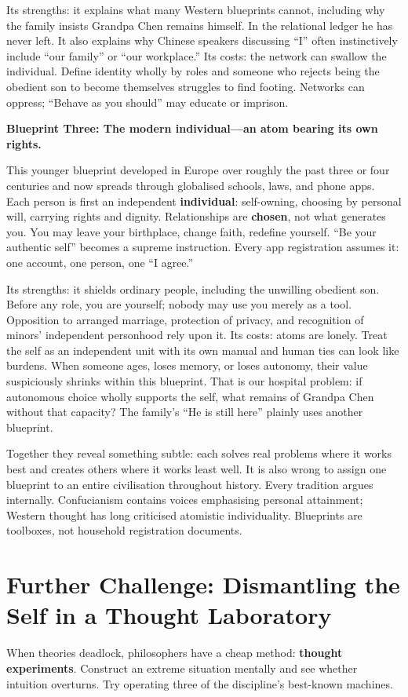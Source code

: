 Its strengths: it explains what many Western blueprints cannot, including why the family insists Grandpa Chen remains himself. In the relational ledger he has never left. It also explains why Chinese speakers discussing ``I'' often instinctively include ``our family'' or ``our workplace.'' Its costs: the network can swallow the individual. Define identity wholly by roles and someone who rejects being the obedient son to become themselves struggles to find footing. Networks can oppress; ``Behave as you should'' may educate or imprison.

\textbf{Blueprint Three: The modern individual---an atom bearing its own rights.}

This younger blueprint developed in Europe over roughly the past three or four centuries and now spreads through globalised schools, laws, and phone apps. Each person is first an independent \textbf{individual}: self-owning, choosing by personal will, carrying rights and dignity. Relationships are \textbf{chosen}, not what generates you. You may leave your birthplace, change faith, redefine yourself. ``Be your authentic self'' becomes a supreme instruction. Every app registration assumes it: one account, one person, one ``I agree.''

Its strengths: it shields ordinary people, including the unwilling obedient son. Before any role, you are yourself; nobody may use you merely as a tool. Opposition to arranged marriage, protection of privacy, and recognition of minors' independent personhood rely upon it. Its costs: atoms are lonely. Treat the self as an independent unit with its own manual and human ties can look like burdens. When someone ages, loses memory, or loses autonomy, their value suspiciously shrinks within this blueprint. That is our hospital problem: if autonomous choice wholly supports the self, what remains of Grandpa Chen without that capacity? The family's ``He is still here'' plainly uses another blueprint.

Together they reveal something subtle: each solves real problems where it works best and creates others where it works least well. It is also wrong to assign one blueprint to an entire civilisation throughout history. Every tradition argues internally. Confucianism contains voices emphasising personal attainment; Western thought has long criticised atomistic individuality. Blueprints are toolboxes, not household registration documents.

\section[Further Challenge: Thought Experiments]{Further Challenge: Dismantling the Self in a Thought Laboratory}
When theories deadlock, philosophers have a cheap method: \textbf{thought experiments}. Construct an extreme situation mentally and see whether intuition overturns. Try operating three of the discipline's best-known machines.

